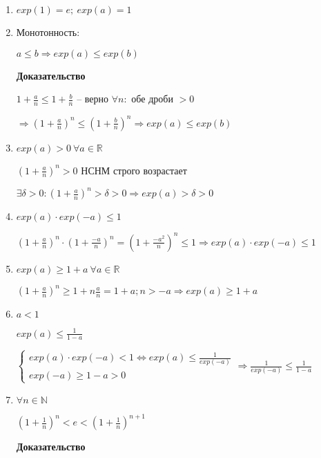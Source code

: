 \documentclass[14pt, letter paper]{article}
\begin{document}
\begin{enumerate}
    \item $exp(1) = e;\ exp(a) = 1$
    \item Монотонность:

    $a \leq b \Rightarrow exp(a) \leq exp(b)$

    \begin{center}
        \textbf{Доказательство}
    \end{center}

    $1 + \frac{a}{n} \leq 1 + \frac{b}{n}$ -- верно $\forall n:$ обе дроби $> 0$

    $\Rightarrow (1 + \frac{a}{n})^n \leq (1 + \frac{b}{n})^n \Rightarrow exp(a) \leq exp(b)$

    \item $exp(a) > 0\ \forall a \in \mathds{R}$

    $(1 + \frac{a}{n})^n > 0$ НСНМ строго возрастает

    $\exists \delta > 0: (1 + \frac{a}{n})^n > \delta > 0 \Rightarrow exp(a) > \delta > 0$

    \item $exp(a) \cdot exp(-a) \leq 1$

    $(1 + \frac{a}{n})^n \cdot (1 + \frac{-a}{n})^n = (1 + \frac{-a^2}{n})^n \leq 1 \Rightarrow exp(a) \cdot exp(-a) \leq 1$

    \item $exp(a) \geq 1 + a\ \forall a \in \mathds{R}$

    $(1 + \frac{a}{n})^n \geq 1 + n \frac{a}{n} = 1 + a; n > -a \Rightarrow exp(a) \geq 1 + a$

    \item $a < 1$

    $exp(a) \leq \frac{1}{1 - a}$

    $\begin{cases}
        exp(a) \cdot exp(-a) < 1 \Leftrightarrow exp(a) \leq \frac{1}{exp(-a)} \\
        exp(-a) \geq 1 - a > 0
    \end{cases} \Rightarrow \frac{1}{exp(-a)} \leq \frac{1}{1-a}$

    \item $\forall n \in \mathds{N}$

    $(1 + \frac{1}{n})^n < e < (1 + \frac{1}{n})^{n+1}$

    \begin{center}
        \textbf{Доказательство}
    \end{center}


\end{enumerate}
\end{document}
